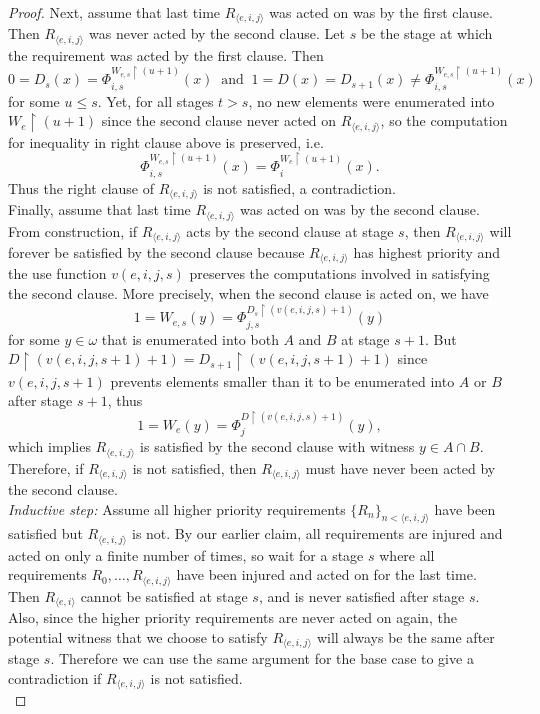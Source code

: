 \documentclass{article}
\begin{document}
\begin{proof}
    Next, assume that last time $R_{\langle e,i,j\rangle}$ was acted on was
    by the first clause. Then $R_{\langle e,i,j\rangle}$ was never acted
    by the second clause. Let $s$ be the stage at which the requirement was
    acted by the first clause. Then
    \[0=D_s(x) =\Phi_{i,s}^{W_{e,s}\restriction (u+1)} (x)\;\;
    \text{and}\;\; 1=D(x)=D_{s+1}(x) \neq\Phi_{i,s}^{W_{e,s}\restriction
    (u+1)} (x)\]
    for some $u\leq s$. Yet, for all stages $t>s$, no new elements were
    enumerated into $W_e\restriction (u+1)$ since the second clause never
    acted on $R_{\langle e,i,j\rangle}$, so the computation for inequality
    in right clause above is preserved, i.e.
    \[\Phi_{i,s}^{W_{e,s}\restriction (u+1)} (x)
    =\Phi_{i}^{W_{e}\restriction (u+1)} (x).\]
    Thus the right clause of $R_{\langle e,i,j\rangle}$ is not satisfied, a
    contradiction. \\

    Finally, assume that last time $R_{\langle e,i,j\rangle}$ was acted on
    was by the second clause. From construction, if $R_{\langle
    e,i,j\rangle}$ acts by the second clause at stage $s$, then $R_{\langle
    e,i,j\rangle}$ will forever be satisfied by the second clause because
    $R_{\langle e,i,j\rangle}$ has highest priority and the use function
    $v(e,i,j,s)$ preserves the computations involved in satisfying the
    second clause.  More precisely, when the second clause is acted on, we
    have \[1=W_{e,s}(y) =\Phi_{j,s}^{D_s\restriction (v(e,i,j,s)+1)}(y)\]
    for some $y\in\omega$ that is enumerated into both $A$ and $B$ at stage
    $s+1$. But $D\restriction (v(e,i,j,s+1)+1) =D_{s+1}\restriction
    (v(e,i,j,s+1)+1)$ since $v(e,i,j,s+1)$ prevents elements smaller than
    it to be enumerated into $A$ or $B$ after stage $s+1$, thus
    \[1=W_{e}(y) =\Phi_{j}^{D\restriction (v(e,i,j,s)+1)}(y),\] which
    implies $R_{\langle e,i,j\rangle}$ is satisfied by the second clause
    with witness $y\in A\cap B$. Therefore, if $R_{\langle e,i,j\rangle}$
    is not satisfied, then $R_{\langle e,i,j\rangle}$ must have never
    been acted by the second clause. \\

    \textit{Inductive step:} Assume all higher priority requirements
    $\{R_n\}_{n <\langle e,i,j\rangle}$ have been satisfied but $R_{\langle
    e,i,j\rangle}$ is not. By our earlier claim, all requirements are
    injured and acted on only a finite number of times, so wait for a
    stage $s$ where all requirements $R_0,\ldots,R_{\langle e,i,j\rangle}$
    have been injured and acted on for the last time. Then $R_{\langle
    e,i\rangle}$ cannot be satisfied at stage $s$, and is never satisfied
    after stage $s$. Also, since the higher priority requirements are never
    acted on again, the potential witness that we choose to satisfy
    $R_{\langle e,i,j\rangle}$ will always be the same after stage $s$.
    Therefore we can use the same argument for the base case to give a
    contradiction if $R_{\langle e,i,j\rangle}$ is not satisfied. \\
  \end{proof}
\end{document}
